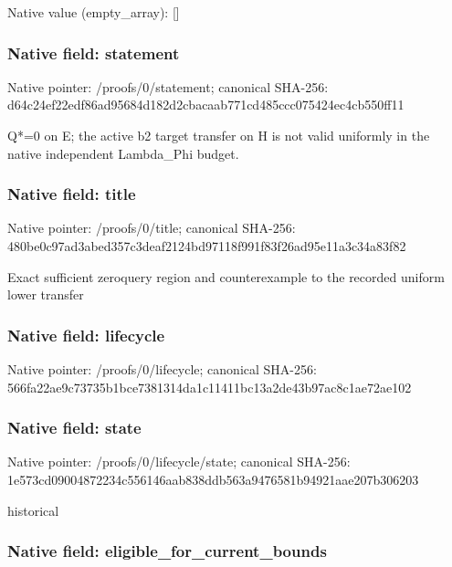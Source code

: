 \documentclass[10pt,a4paper]{article}
\begin{document}
Native value (empty\_array): []



\subsubsection{Native field: statement}


Native pointer: /proofs/0/statement; canonical SHA-256: d64c24ef22edf86ad95684d1\allowbreak{}82d2cbacaab771cd485ccc07\allowbreak{}5424ec4cb550ff11


Q*=0 on E; the active b2 target transfer on H is not valid uniformly in the native independent Lambda\_Phi budget.


\subsubsection{Native field: title}


Native pointer: /proofs/0/title; canonical SHA-256: 480be0c97ad3abed357c3dea\allowbreak{}f2124bd97118f991f83f26ad\allowbreak{}95e11a3c34a83f82


Exact sufficient zeroquery region and counterexample to the recorded uniform lower transfer


\subsubsection{Native field: lifecycle}


Native pointer: /proofs/0/lifecycle; canonical SHA-256: 566fa22ae9c73735b1bce738\allowbreak{}1314da1c11411bc13a2de43b\allowbreak{}97ac8c1ae72ae102



\subsubsection{Native field: state}


Native pointer: /proofs/0/lifecycle/state; canonical SHA-256: 1e573cd09004872234c55614\allowbreak{}6aab838ddb563a9476581b94\allowbreak{}921aae207b306203


historical


\subsubsection{Native field: eligible\_for\_current\_bounds}
\end{document}
